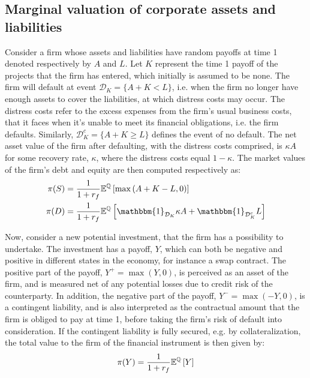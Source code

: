 \documentclass[../main.tex]{subfiles}
\begin{document}
    \subsection{Marginal valuation of corporate assets and liabilities}
        Consider a firm whose assets and liabilities have random payoffs at time 1 denoted respectively by $A$ and $L$.  
        Let $K$ represent the time 1 payoff of the projects that the firm has entered, which initially is assumed to be none.      
        The firm will default at event $\mathcal{D}_K=\{A + K<L\}$, i.e. when the firm no longer have enough assets to cover the liabilities, at which distress costs may occur.
        The distress costs refer to the excess expenses from the firm's usual business costs,
        that it faces when it's unable to meet its financial obligations, i.e. the firm defaults.
        Similarly, $\mathcal{D}_{K}^c = \{A + K \geq L\}$ defines the event of no default.
        The net asset value of the firm after defaulting, with the distress costs comprised, is $\kappa A$ for some recovery rate, $\kappa$, where the distress costs equal $1-\kappa$.
        The market values of the firm's debt and equity are then computed respectively as:
        \begin{align}
            \pi(S) &= \discountfactor \mathbb{E}^{\mathbb{Q}}\left[\max\left(A+K-L,0\right)\right]\\
            \pi(D) &= \discountfactor \mathbb{E}^{\mathbb{Q}}\left[\mathbbm{1}_{\mathcal{D}_{K}}\kappa A + \mathbbm{1}_{\mathcal{D}_{K}^c}L\right]
        \end{align}

        Now, consider a new potential investment, that the firm has a possibility to undertake.
        The investment has a payoff, $Y$, which can both be negative and positive in different states in the economy, for instance a swap contract.
        The positive part of the payoff, $Y^{+}=\max\left(Y,0\right)$, is perceived as an asset of the firm, and is measured net of any potential losses due to credit risk of the counterparty.
        In addition, the negative part of the payoff, $Y^{-} = \max \left(-Y,0\right)$, is a contingent liability, and is also interpreted as the contractual amount that the firm is obliged to pay at time 1, before taking the firm's risk of default into consideration.
        If the contingent liability is fully secured, e.g. by collateralization, the total value to the firm of the financial instrument is then given by:
        \begin{equation}
            \pi(Y) = \frac{1}{1 + r_{f}} \mathbb{E}^{\mathbb{Q}} \left[Y\right]
        \end{equation}
\end{document}
